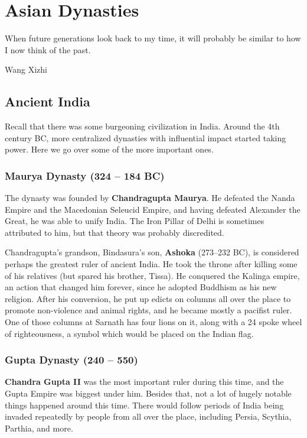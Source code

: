 \chapter{Asian Dynasties}

\epigraph{%
  When future generations look back to my time, it will probably be similar to how I now think of the past.
}{Wang Xizhi}

\section{Ancient India}

Recall that there was some burgeoning civilization in India.
Around the 4th century BC, more centralized dynasties with influential impact started taking power.
Here we go over some of the more important ones.

\subsection*{Maurya Dynasty (324 -- 184 BC)}

The dynasty was founded by \textbf{Chandragupta Maurya}.
He defeated the Nanda Empire and the Macedonian Seleucid Empire,
and having defeated Alexander the Great, he was able to unify India.
The Iron Pillar of Delhi is sometimes attributed to him, but that theory was probably discredited.

Chandragupta's grandson, Bindasura's son,
\textbf{Ashoka} (273--232 BC), is considered perhaps the greatest ruler of ancient India.
He took the throne after killing some of his relatives (but spared his brother, Tissa).
He conquered the Kalinga empire, an action that changed him forever,
since he adopted Buddhism as his new religion.
After his conversion, he put up edicts on columns all over the place to promote non-violence and animal rights,
and he became mostly a pacifist ruler.
One of those columns at Sarnath has four lions on it,
along with a 24 spoke wheel of righteousness, a symbol which would be placed on the Indian flag.

\subsection*{Gupta Dynasty (240 -- 550)}

\textbf{Chandra Gupta II} was the most important ruler during this time,
and the Gupta Empire was biggest under him.
Besides that, not a lot of hugely notable things happened around this time.
There would follow periods of India being invaded repeatedly by people from
all over the place, including Persia, Scythia, Parthia, and more.

